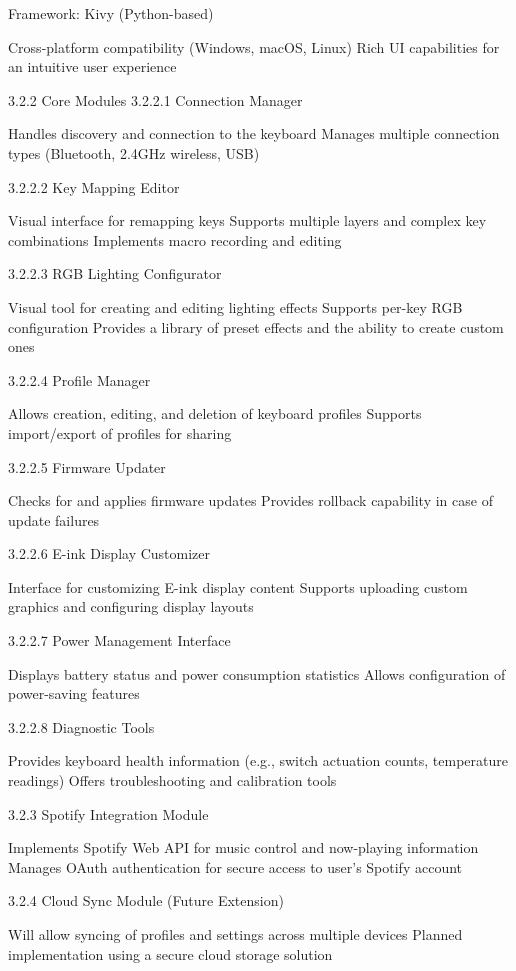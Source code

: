 \documentclass[a4paper,11pt]{article}%
\begin{document}
Framework: Kivy (Python-based)

Cross-platform compatibility (Windows, macOS, Linux)
Rich UI capabilities for an intuitive user experience



3.2.2 Core Modules
3.2.2.1 Connection Manager

Handles discovery and connection to the keyboard
Manages multiple connection types (Bluetooth, 2.4GHz wireless, USB)

3.2.2.2 Key Mapping Editor

Visual interface for remapping keys
Supports multiple layers and complex key combinations
Implements macro recording and editing

3.2.2.3 RGB Lighting Configurator

Visual tool for creating and editing lighting effects
Supports per-key RGB configuration
Provides a library of preset effects and the ability to create custom ones

3.2.2.4 Profile Manager

Allows creation, editing, and deletion of keyboard profiles
Supports import/export of profiles for sharing

3.2.2.5 Firmware Updater

Checks for and applies firmware updates
Provides rollback capability in case of update failures

3.2.2.6 E-ink Display Customizer

Interface for customizing E-ink display content
Supports uploading custom graphics and configuring display layouts

3.2.2.7 Power Management Interface

Displays battery status and power consumption statistics
Allows configuration of power-saving features

3.2.2.8 Diagnostic Tools

Provides keyboard health information (e.g., switch actuation counts, temperature readings)
Offers troubleshooting and calibration tools

3.2.3 Spotify Integration Module

Implements Spotify Web API for music control and now-playing information
Manages OAuth authentication for secure access to user's Spotify account

3.2.4 Cloud Sync Module (Future Extension)

Will allow syncing of profiles and settings across multiple devices
Planned implementation using a secure cloud storage solution
\end{document}
